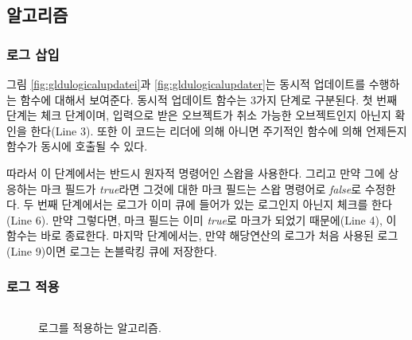 \subsection{알고리즘}

\subsubsection{로그 삽입}
그림 \ref{fig:gldulogicalupdatei}과 \ref{fig:gldulogicalupdater}는 동시적 업데이트를 수행하는
함수에 대해서 보여준다.
동시적 업데이트 함수는 3가지 단계로 구분된다.
첫 번째 단계는 체크 단계이며, 입력으로 받은 오브젝트가 취소 가능한 오브젝트인지 아닌지 확인을 한다(Line 3). 
또한 이 코드는 리더에 의해 아니면 주기적인 함수에 의해 언제든지  함수가 동시에 호출될 수 있다. 

따라서 이 단계에서는 반드시 원자적 명령어인 스왑을 사용한다.
그리고 만약 그에 상응하는 마크 필드가 \textit{true}라면 그것에 대한 마크 필드는 스왑 명령어로 \textit{false}로
수정한다.
두 번째 단계에서는 로그가 이미 큐에 들어가 있는 로그인지 아닌지 체크를 한다(Line 6).
만약 그렇다면, 마크 필드는 이미 \textit{true}로 마크가 되었기 때문에(Line 4), 이 함수는 바로 종료한다.
마지막 단계에서는, 만약 해당연산의 로그가 처음 사용된 로그(Line 9)이면 로그는 논블락킹 큐에 저장한다.

\subsubsection{로그 적용}

\begin{figure}[h]
\begin{center}
\inputminted[linenos,fontsize=\footnotesize, tabsize=4]{c}{src/ldu_physical.c}
\end{center}
\caption{로그를 적용하는 알고리즘.}
\label{fig:glduphysicalupdate_p}
\end{figure}


